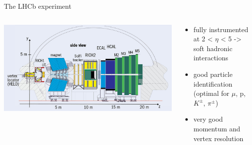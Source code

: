 \documentclass[aspectratio=1610, 9pt]{beamer}
\begin{document}
\begin{frame}{The LHCb experiment}
  \begin{columns}
    \begin{column}[c]{0.48\textwidth}
      \includegraphics[width=\textwidth]{lhcb_side.jpg}
    \end{column}
    \begin{column}[c]{0.48\textwidth}
      \begin{itemize}
        \item fully instrumented at 2 < $\eta$ < 5 -> soft hadronic interactions
        \item good particle identification (optimal for $\mu$, p, $K^{\pm}$, $\pi^{\pm}$)
        \item very good momentum and vertex resolution
      \end{itemize}
    \end{column}
  \end{columns}
\end{frame}
\end{document}
